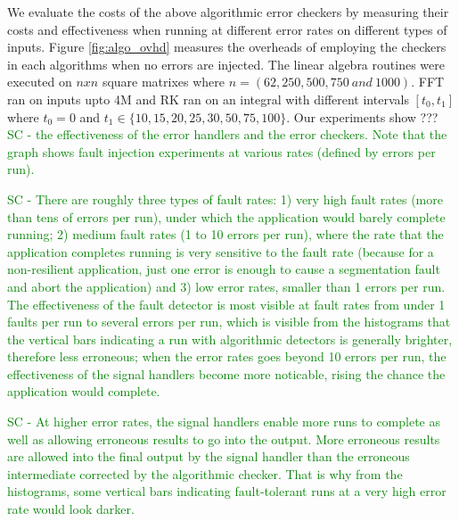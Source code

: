 \documentclass{sig-alternate}
\newcommand{\sui}[1]{%
  \textcolor{green}{SC - #1}
}
\begin{document}
We evaluate the costs of the above algorithmic error checkers by measuring their costs and effectiveness when running at different error rates on different types of inputs.
Figure \ref{fig:algo_ovhd} measures the overheads of employing the checkers in each algorithms when no errors are injected.
The linear algebra routines were executed on $nxn$ square matrixes where $n=(62, 250, 500, 750\ and\ 1000)$.
FFT ran on inputs upto 4M and RK ran on an integral with different intervals $[t_0, t_1]$ where $t_0=0$ and $t_1 \in \{10, 15, 20, 25, 30, 50, 75, 100\}$.
Our experiments show ???\sui{the effectiveness of the error handlers and the error checkers. Note that the graph shows fault injection experiments at various rates (defined by errors per run).}

\sui{There are roughly three types of fault rates: 1) very high fault rates (more than tens of errors per run), under which the application would barely complete running; 2) medium fault rates (1 to 10 errors per run), where the rate that the application completes running is very sensitive to the fault rate (because for a non-resilient application, just one error is enough to cause a segmentation fault and abort the application) and 3) low error rates, smaller than 1 errors per run. The effectiveness of the fault detector is most visible at fault rates from under 1 faults per run to several errors per run, which is visible from the histograms that the vertical bars indicating a run with algorithmic detectors is generally brighter, therefore less erroneous; when the error rates goes beyond 10 errors per run, the effectiveness of the signal handlers become more noticable, rising the chance the application would complete.}

\sui{At higher error rates, the signal handlers enable more runs to complete as well as allowing erroneous results to go into the output. More erroneous results are allowed into the final output by the signal handler than the erroneous intermediate corrected by the algorithmic checker. That is why from the histograms, some vertical bars indicating fault-tolerant runs at a very high error rate would look darker.}

\end{document}
